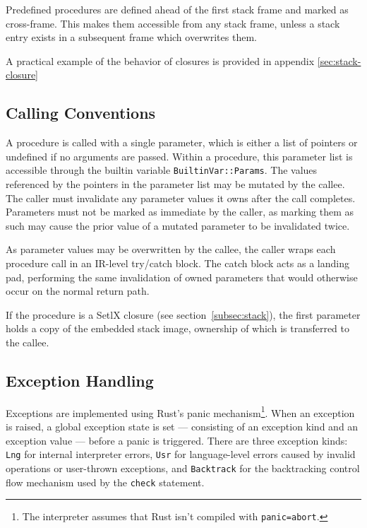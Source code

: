 Predefined procedures are defined ahead of the first stack frame and marked as cross-frame. This makes them accessible from any stack frame, unless a stack entry exists in a subsequent frame which overwrites them.

A practical example of the behavior of closures is provided in appendix \ref{sec:stack-closure}

\subsection{Calling Conventions}

A procedure is called with a single parameter, which is either a list of pointers or undefined if no arguments are passed. Within a procedure, this parameter list is accessible through the builtin variable \texttt{BuiltinVar::Params}. The values referenced by the pointers in the parameter list may be mutated by the callee. The caller must invalidate any parameter values it owns after the call completes. Parameters must not be marked as immediate by the caller, as marking them as such may cause the prior value of a mutated parameter to be invalidated twice.

As parameter values may be overwritten by the callee, the caller wraps each procedure call in an IR-level try/catch block. The catch block acts as a landing pad, performing the same invalidation of owned parameters that would otherwise occur on the normal return path.

If the procedure is a SetlX closure (see section~\ref{subsec:stack}), the first parameter holds a copy of the embedded stack image, ownership of which is transferred to the callee.

\subsection{Exception Handling}

Exceptions are implemented using Rust's panic mechanism\footnote{The interpreter assumes that Rust isn't compiled with \texttt{panic=abort}.}. When an exception is raised, a global exception state is set --- consisting of an exception kind and an exception value --- before a panic is triggered. There are three exception kinds: \texttt{Lng} for internal interpreter errors, \texttt{Usr} for language-level errors caused by invalid operations or user-thrown exceptions, and \texttt{Backtrack} for the backtracking control flow mechanism used by the \texttt{check} statement.

